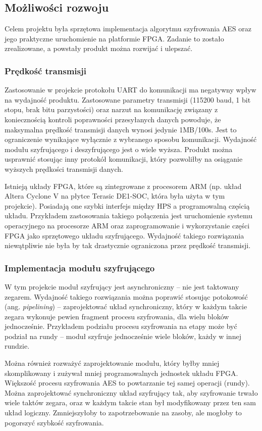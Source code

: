 \subsection{Możliwości rozwoju}
Celem projektu była sprzętowa implementacja algorytmu szyfrowania AES oraz jego praktyczne uruchomienie na platformie FPGA. Zadanie to zostało zrealizowane, a powstały produkt można rozwijać i ulepszać.

\subsubsection{Prędkość transmisji}
Zastosowanie w projekcie protokołu UART do komunikacji ma negatywny wpływ na wydajność produktu. Zastosowane parametry transmisji (115200 baud, 1 bit stopu, brak bitu parzystości) oraz narzut na komunikację związany z koniecznością kontroli poprawności przesyłanych danych powoduje, że maksymalna prędkość transmisji danych wynosi jedynie 1MB/100s. Jest to ograniczenie wynikające wyłącznie z wybranego sposobu komunikacji. Wydajność modułu szyfrującego i deszyfrującego jest o wiele wyższa. Produkt można usprawnić stosując inny protokół komunikacji, który pozwoliłby na osiąganie wyższych prędkości transmisji danych.

Istnieją układy FPGA, które są zintegrowane z procesorem ARM (np. układ Altera Cyclone V na płytce Terasic DE1-SOC, która była użyta w tym projekcie). Posiadają one szybki interfejs między HPS a programowalną częścią układu. Przykładem zastosowania takiego połączenia jest uruchomienie systemu operacyjnego na procesorze ARM oraz zaprogramowanie i wykorzystanie części FPGA jako sprzętowego układu szyfrującego. Wydajność takiego rozwiązania niewątpliwie nie była by tak drastycznie ograniczona przez prędkość transmisji.

\subsubsection{Implementacja modułu szyfrującego}
W tym projekcie moduł szyfrujący jest asynchroniczny -- nie jest taktowany zegarem. Wydajność takiego rozwiązania można poprawić stosując potokowość (ang. \textit{pipelining}) -- zaprojektować układ synchroniczny, który w każdym takcie zegara wykonuje pewien fragment procesu szyfrowania, dla wielu bloków jednocześnie. Przykładem podziału procesu szyfrowania na etapy może być podział na rundy -- moduł szyfruje jednocześnie wiele bloków, każdy w innej rundzie.

Można również rozważyć zaprojektowanie modułu, który byłby mniej skomplikowany i zużywał mniej programowalnych jednostek układu FPGA. Większość procesu szyfrowania AES to powtarzanie tej samej operacji (rundy). Można zaprojektować synchroniczny układ szyfrujący tak, aby szyfrowanie trwało wiele taktów zegara, oraz w każdym takcie stan był modyfikowany przez ten sam układ logiczny. Zmniejszyłoby to zapotrzebowanie na zasoby, ale mogłoby to pogorszyć szybkość szyfrowania.

